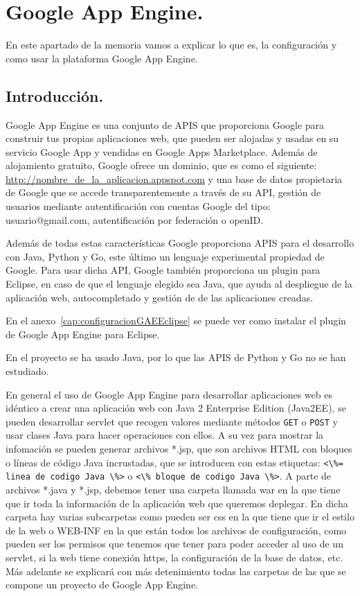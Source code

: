 \chapter{Google App Engine.}\label{cap:GAE}
En este apartado de la memoria vamos a explicar lo que es, la configuración y como usar la plataforma Google App Engine.

\section{Introducción.}
Google App Engine es una conjunto de APIS que proporciona Google para construir tus propias aplicaciones web, que pueden ser alojadas y usadas en su servicio Google App y vendidas en Google Apps Marketplace. Además de alojamiento gratuito, Google ofrece un dominio, que es como el siguiente: \url{http://nombre\_de\_la\_aplicacion.appspot.com} y una base de datos propietaria de Google que se accede transparentemente a través de su API, gestión de usuarios mediante autentificación con cuentas Google del tipo: usuario@gmail.com, autentificación por federación o openID.

Además de todas estas características Google proporciona APIS para el desarrollo con Java, Python y Go, este último un lenguaje experimental propiedad de Google. Para usar dicha API, Google también proporciona un plugin para Eclipse, en caso de que el lenguaje elegido sea Java, que ayuda al despliegue de la aplicación web, autocompletado y gestión de de las aplicaciones creadas. 

En el anexo~\ref{cap:configuracionGAEEclipse} se puede ver como instalar el plugin de Google App Engine para Eclipse.

En el proyecto se ha usado Java, por lo que las APIS de Python y Go no se han estudiado.

En general el uso de Google App Engine para desarrollar aplicaciones web es idéntico a crear una aplicación web con Java 2 Enterprise Edition (Java2EE), se pueden desarrollar servlet que recogen valores mediante métodos \lstinline{GET} o \lstinline{POST} y usar clases Java para hacer operaciones con ellos. A su vez para mostrar la infomación se pueden generar archivos *.jsp, que son archivos HTML con bloques o líneas de código Java incrustadas, que se introducen con estas etiquetas: \lstinline{<\%= linea de codigo Java \%>} o \lstinline{<\% bloque de codigo Java \%>}. A parte de archivos *.java y *.jsp, debemos tener una carpeta llamada war en la que tiene que ir toda la información de la aplicación web que queremos deplegar. En dicha carpeta hay varias subcarpetas como pueden ser css en la que tiene que ir el estilo de la web o WEB-INF en la que están todos los archivos de configuración, como pueden ser los permisos que tenemos que tener para poder acceder al uso de un servlet, si la web tiene conexión https, la configuración de la base de datos, etc. Más adelante se explicará con más detenimiento todas las carpetas de las que se compone un proyecto de Google App Engine.

